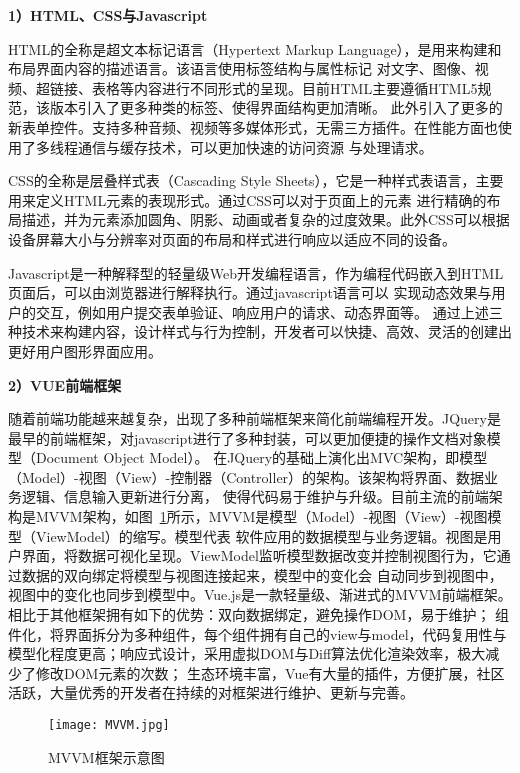 \textbf{1）HTML、CSS与Javascript}

HTML的全称是超文本标记语言（Hypertext Markup Language），是用来构建和布局界面内容的描述语言。该语言使用标签结构与属性标记
对文字、图像、视频、超链接、表格等内容进行不同形式的呈现。目前HTML主要遵循HTML5规范，该版本引入了更多种类的标签、使得界面结构更加清晰。
此外引入了更多的新表单控件。支持多种音频、视频等多媒体形式，无需三方插件。在性能方面也使用了多线程通信与缓存技术，可以更加快速的访问资源
与处理请求。

CSS的全称是层叠样式表（Cascading Style Sheets），它是一种样式表语言，主要用来定义HTML元素的表现形式。通过CSS可以对于页面上的元素
进行精确的布局描述，并为元素添加圆角、阴影、动画或者复杂的过度效果。此外CSS可以根据设备屏幕大小与分辨率对页面的布局和样式进行响应以适应不同的设备。

Javascript是一种解释型的轻量级Web开发编程语言，作为编程代码嵌入到HTML页面后，可以由浏览器进行解释执行。通过javascript语言可以
实现动态效果与用户的交互，例如用户提交表单验证、响应用户的请求、动态界面等。
通过上述三种技术来构建内容，设计样式与行为控制，开发者可以快捷、高效、灵活的创建出更好用户图形界面应用。

\textbf{2）VUE前端框架}

随着前端功能越来越复杂，出现了多种前端框架来简化前端编程开发。JQuery是最早的前端框架，对javascript进行了多种封装，可以更加便捷的操作文档对象模型（Document Object Model）。
在JQuery的基础上演化出MVC架构，即模型（Model）-视图（View）-控制器（Controller）的架构。该架构将界面、数据业务逻辑、信息输入更新进行分离，
使得代码易于维护与升级。目前主流的前端架构是MVVM架构，如图~\ref{fig:mvvm}所示，MVVM是模型（Model）-视图（View）-视图模型（ViewModel）的缩写。模型代表
软件应用的数据模型与业务逻辑。视图是用户界面，将数据可视化呈现。ViewModel监听模型数据改变并控制视图行为，它通过数据的双向绑定将模型与视图连接起来，模型中的变化会
自动同步到视图中，视图中的变化也同步到模型中。Vue.js\cite{nelson2018getting}是一款轻量级、渐进式的MVVM前端框架。相比于其他框架拥有如下的优势：双向数据绑定，避免操作DOM，易于维护；
组件化，将界面拆分为多种组件，每个组件拥有自己的view与model，代码复用性与模型化程度更高；响应式设计，采用虚拟DOM与Diff算法优化渲染效率，极大减少了修改DOM元素的次数；
生态环境丰富，Vue有大量的插件，方便扩展，社区活跃，大量优秀的开发者在持续的对框架进行维护、更新与完善。

\begin{figure}[htbp]
  \centering
  \texttt{[image: MVVM.jpg]}
  \caption{MVVM框架示意图}
  \label{fig:mvvm}
\end{figure}

